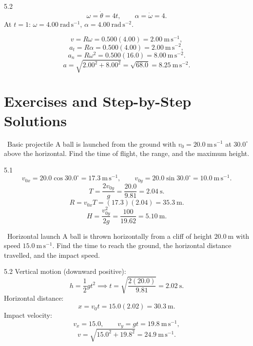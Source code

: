 \begin{solution}{5.2}
\[
\omega=\dot\theta=4t,\qquad \alpha=\dot\omega=4.
\]
At $t=1$: $\omega=4.00\ \mathrm{rad\,s^{-1}}$, $\alpha=4.00\ \mathrm{rad\,s^{-2}}$.

\[
v=R\omega=0.500(4.00)=2.00\ \mathrm{m\,s^{-1}},
\]
\[
a_t=R\alpha=0.500(4.00)=2.00\ \mathrm{m\,s^{-2}},
\]
\[
a_n=R\omega^2=0.500(16.0)=8.00\ \mathrm{m\,s^{-2}}.
\]
\[
a=\sqrt{2.00^2+8.00^2}=\sqrt{68.0}=8.25\ \mathrm{m\,s^{-2}}.
\]
\end{solution}

\section{Exercises and Step-by-Step Solutions}

\begin{exercise}{\warm\ Basic projectile}
A ball is launched from the ground with $v_0=20.0\ \mathrm{m\,s^{-1}}$ at
$30.0^\circ$ above the horizontal. Find the time of flight, the range, and the
maximum height.
\end{exercise}

\begin{tabletworkspace}[6.5cm]
\end{tabletworkspace}

\begin{solution}{5.1}
\[
v_{0x}=20.0\cos30.0^\circ=17.3\ \mathrm{m\,s^{-1}},\qquad
v_{0y}=20.0\sin30.0^\circ=10.0\ \mathrm{m\,s^{-1}}.
\]
\[
T=\frac{2v_{0y}}{g}=\frac{20.0}{9.81}=2.04\ \mathrm{s}.
\]
\[
R=v_{0x}T=(17.3)(2.04)=35.3\ \mathrm{m}.
\]
\[
H=\frac{v_{0y}^2}{2g}=\frac{100}{19.62}=5.10\ \mathrm{m}.
\]
\end{solution}

\begin{exercise}{\warm\ Horizontal launch}
A ball is thrown horizontally from a cliff of height $20.0\ \mathrm{m}$ with
speed $15.0\ \mathrm{m\,s^{-1}}$. Find the time to reach the ground, the
horizontal distance travelled, and the impact speed.
\end{exercise}

\begin{tabletworkspace}[6.5cm]
\end{tabletworkspace}

\begin{solution}{5.2}
Vertical motion (downward positive):
\[
h=\frac12gt^2
\implies
t=\sqrt{\frac{2(20.0)}{9.81}}=2.02\ \mathrm{s}.
\]
Horizontal distance:
\[
x=v_0t=15.0(2.02)=30.3\ \mathrm{m}.
\]
Impact velocity:
\[
v_x=15.0,\qquad v_y=gt=19.8\ \mathrm{m\,s^{-1}},
\]
\[
v=\sqrt{15.0^2+19.8^2}=24.9\ \mathrm{m\,s^{-1}}.
\]
\end{solution}

